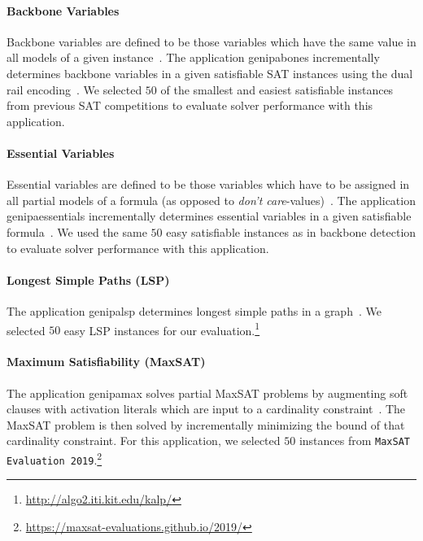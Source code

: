 \documentclass{elsarticle}
\begin{document}
\paragraph{Backbone Variables}

Backbone variables are defined to be those variables which have the same value in all models of a given instance~\cite{Janota:2015:Backbones}. 
The application \textsf{genipabones} incrementally determines backbone variables in a given satisfiable SAT instances using the dual rail encoding~\cite{Balyo:2015:SATRace}.
We selected $50$ of the smallest and easiest satisfiable instances from previous SAT competitions to evaluate solver performance with this application. 

\paragraph{Essential Variables}

Essential variables are defined to be those variables which have to be assigned in all partial models of a formula (as opposed to \emph{don't care}-values)~\cite{Bryant:1987:Essentials}. 
The application \textsf{genipaessentials} incrementally determines essential variables in a given satisfiable formula~\cite{Balyo:2015:SATRace}. 
We used the same $50$ easy satisfiable instances as in backbone detection to evaluate solver performance with this application. 

\paragraph{Longest Simple Paths (LSP)}

The application \textsf{genipalsp} determines longest simple paths in a graph~\cite{Balyo:2019:LSP}. 
We selected $50$ easy LSP instances for our evaluation.\footnote{\url{http://algo2.iti.kit.edu/kalp/}} 

\paragraph{Maximum Satisfiability (MaxSAT)}

The application \textsf{genipamax} solves partial MaxSAT problems by augmenting soft clauses with activation literals which are input to a cardinality constraint~\cite{Philipp:2015:PBLib}. 
The MaxSAT problem is then solved by incrementally minimizing the bound of that cardinality constraint. 
For this application, we selected $50$ instances from \texttt{MaxSAT Evaluation 2019}.\footnote{\url{https://maxsat-evaluations.github.io/2019/}}
\end{document}
